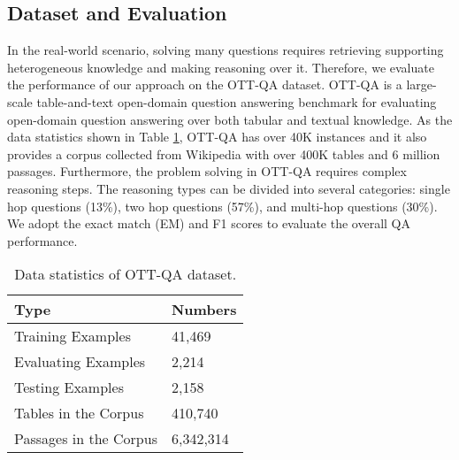 \documentclass[11pt]{article}
\begin{document}
	\subsection{Dataset and Evaluation}
	In the real-world scenario, solving many questions requires retrieving supporting heterogeneous knowledge and making reasoning over it.
	Therefore, we evaluate the performance of our approach on the OTT-QA \cite{chen2020open} dataset. 
	OTT-QA is a large-scale table-and-text open-domain question answering benchmark for evaluating open-domain question answering over both tabular and textual knowledge. 
	As the data statistics shown in Table \ref{tab:data-statistic}, OTT-QA has over 40K instances and it also provides a corpus collected from Wikipedia with over 400K tables and 6 million passages. 
	Furthermore, the problem solving in OTT-QA requires complex reasoning steps.
	The reasoning types can be divided into several categories: single hop questions (13\%), two hop questions (57\%), and multi-hop questions (30\%).
We adopt the exact match (EM) and F1 scores \cite{spider} to evaluate the overall QA performance. 
	\begin{table}[h]
		\centering
		\begin{tabular}{ll}
			\hline
			Type & Numbers \\
			\hline
			Training Examples                               & 41,469  \\ 
			Evaluating Examples  & 2,214          \\
			Testing Examples    & 2,158     \\
			Tables in the Corpus  &  410,740         \\
			Passages in the Corpus & 6,342,314 \\ 
\hline
		\end{tabular}
		\caption{Data statistics of OTT-QA dataset.}
		\label{tab:data-statistic}
	\end{table}
	
\end{document}

